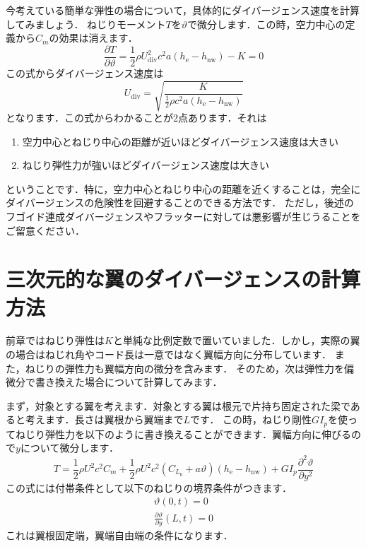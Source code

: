 \documentclass{jarticle}
\begin{document}
今考えている簡単な弾性の場合について，具体的にダイバージェンス速度を計算してみましょう．
ねじりモーメント$T$を$\vartheta$で微分します．この時，空力中心の定義から$C_m$の効果は消えます．
\begin{equation}\label{Tv}
    \frac{\partial T}{\partial \vartheta} = \frac{1}{2}\rho U_\mathrm{div}^2 c^2 a  (h_\mathrm{e}-h_\mathrm{nw}) - K = 0
\end{equation}
この式からダイバージェンス速度は
\begin{equation}
    U_\mathrm{div} = \sqrt{\frac{K}{\frac{1}{2}\rho c^2 a  (h_\mathrm{e}-h_\mathrm{nw})}}
\end{equation}
となります．この式からわかることが2点あります．それは
\begin{enumerate}
    \item 空力中心とねじり中心の距離が近いほどダイバージェンス速度は大きい
    \item ねじり弾性力が強いほどダイバージェンス速度は大きい
\end{enumerate}
ということです．特に，空力中心とねじり中心の距離を近くすることは，完全にダイバージェンスの危険性を回避することのできる方法です．
ただし，後述のフゴイド連成ダイバージェンスやフラッターに対しては悪影響が生じうることをご留意ください．

\section{三次元的な翼のダイバージェンスの計算方法}

前章ではねじり弾性は$K$と単純な比例定数で置いていました．しかし，実際の翼の場合はねじれ角やコード長は一意ではなく翼幅方向に分布しています．
また，ねじりの弾性力も翼幅方向の微分を含みます．
そのため，次は弾性力を偏微分で書き換えた場合について計算してみます．

まず，対象とする翼を考えます．対象とする翼は根元で片持ち固定された梁であると考えます．長さは翼根から翼端まで$L$です．
この時，ねじり剛性$GI_p$を使ってねじり弾性力を以下のように書き換えることができます．翼幅方向に伸びるので$y$について微分します．
\begin{equation} \label{gip}
    T = \frac{1}{2}\rho U^2 c^2 C_m + \frac{1}{2}\rho U^2 c^2 (C_{L_0} + a\vartheta)  (h_\mathrm{e}-h_\mathrm{nw}) + GI_p \frac{\partial^2 \vartheta}{\partial y^2}
\end{equation}
この式には付帯条件として以下のねじりの境界条件がつきます．
\begin{align}
    \vartheta(0,t) = 0 \\
    \frac{\partial \vartheta}{\partial y}(L,t) = 0
\end{align}
これは翼根固定端，翼端自由端の条件になります．
\end{document}
